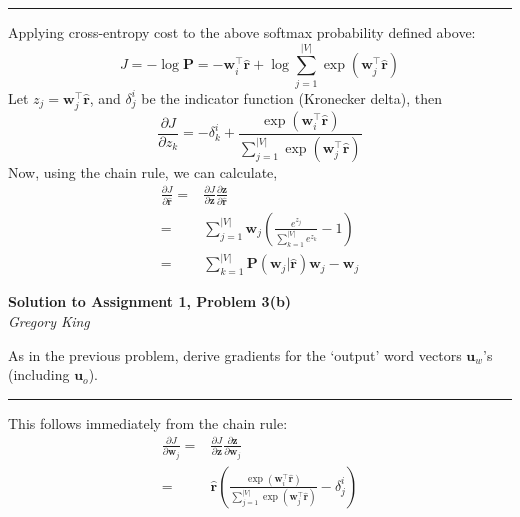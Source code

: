 \documentclass[letter,12pt]{article}
\newcommand{\myhwtitle}[3]
{\begin{center}
{\large {\bf Solution to Assignment {#1}, Problem {#2}}}\\
\medskip 
{\it {#3}} %
\end{center}}
\begin{document}
\noindent\rule{\textwidth}{0.4pt}\vspace{5mm}
Applying cross-entropy cost to the above softmax probability defined above:
\begin{equation}
J =-\log{\boldsymbol P} = - {\boldsymbol w}_{i}^{\top}\hat{\boldsymbol r} + \log\sum^{\vert{V}\vert}_{j=1}\exp{({\boldsymbol w}^{\top}_{j}\hat{\boldsymbol r})}
\end{equation}
Let $z_{j}={\boldsymbol w}_{j}^{\top}\hat{\boldsymbol r}$, and $\delta^{i}_{j}$ be the indicator function (Kronecker delta), then
\begin{equation}
\frac{\partial J}{\partial{z_{k}}} = - \delta^{i}_{k} + \frac{\exp{({\boldsymbol w}^{\top}_{i}\hat{\boldsymbol r})}}{\sum^{\vert{V}\vert}_{j=1}\exp{({\boldsymbol w}^{\top}_{j}\hat{\boldsymbol r})}}
\end{equation}
Now, using the chain rule, we can calculate,
\begin{align}
\frac{\partial J}{\partial{\hat{\boldsymbol r}}} =&\frac{\partial J}{\partial{{\boldsymbol z}}}\frac{\partial{{\boldsymbol z}}}{\partial{\hat{\boldsymbol r}}} \\
                                                                    =& \sum^{\vert{V}\vert}_{j=1} {\boldsymbol w}_{j}\left(\frac{e^{z_{j}}}{\sum^{\vert{V}\vert}_{k=1}e^{z_{k}}} -  1\right) \\
                                                                    =&\sum^{\vert{V}\vert}_{k=1}{\boldsymbol P}( {\boldsymbol w}_{j} \vert \hat{\boldsymbol r} ) {\boldsymbol w}_{j} -  {\boldsymbol w}_{j}
\end{align}

\clearpage

\myhwtitle{1}{3(b)}{Gregory King}

\bigskip
\noindent As in the previous problem, derive gradients for the `output' word vectors ${\boldsymbol u}_{w}$'s (including ${\boldsymbol u}_{o}$).\vspace{5mm}
\noindent\rule{\textwidth}{0.4pt}\vspace{5mm}
This follows immediately from the chain rule:
\begin{align}
\frac{\partial J}{\partial{\boldsymbol w}_{j}} = &\frac{\partial J}{\partial{{\boldsymbol z}}}\frac{\partial{{\boldsymbol z}}}{\partial{\boldsymbol w}_{j}} \\
                                                                  = & \hat{\boldsymbol r}\left(\frac{\exp{({\boldsymbol w}^{\top}_{i}\hat{\boldsymbol r})}}{\sum^{\vert{V}\vert}_{j=1}\exp{({\boldsymbol w}^{\top}_{j}\hat{\boldsymbol r})}} - \delta^{i}_{j}\right)
\end{align}
\clearpage
\end{document}
